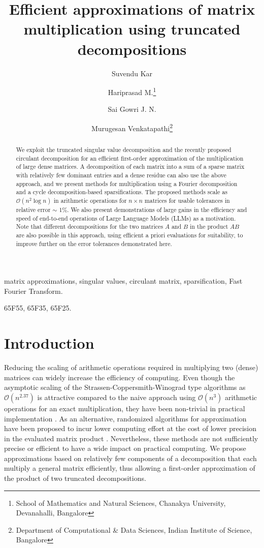 \documentclass[onefignum,onetabnum]{siamart171218}
\title{Efficient approximations of matrix multiplication using truncated decompositions}
\author{
Suvendu Kar
\and
Hariprasad M.\thanks{School of Mathematics and Natural Sciences, Chanakya University, Devanahalli, Bangalore }\email{(hariprasad.h@chanakyauniversity.edu.in)}
\and
Sai Gowri J. N.
\and
Murugesan Venkatapathi\thanks{Department of Computational \& Data Sciences, Indian Institute of Science, Bangalore }\email{(murugesh@iisc.ac.in)}
}
\begin{document}
\maketitle
	
\begin{abstract}
We exploit the truncated singular value decomposition and the recently proposed circulant decomposition for an efficient first-order approximation of the multiplication of large dense matrices. A decomposition of each matrix into a sum of a sparse matrix with relatively few dominant entries and a dense residue can also use the above approach, and we present methods for multiplication using a Fourier decomposition and a cycle decomposition-based sparsifications. The proposed methods scale as $\mathcal{O}(n^2 \log n)$ in arithmetic operations for $n \times n$ matrices for usable tolerances in relative error $\sim$ 1\%. We also present demonstrations of large gains in the efficiency and speed of end-to-end operations of Large Language Models (LLMs) as a motivation. Note that different decompositions for the two matrices $A$ and $B$ in the product $AB$ are also possible in this approach, using efficient a priori evaluations for suitability, to improve further on the error tolerances demonstrated here.
\end{abstract}
	
	\begin{keywords}
		matrix approximations, singular values, circulant matrix, sparsification, Fast Fourier Transform.
	\end{keywords}
	
	\begin{AMS}
		65F55, 65F35, 65F25.
	\end{AMS}


\section{Introduction}
Reducing the scaling of arithmetic operations required in multiplying two (dense) matrices can widely increase the efficiency of computing. Even though the asymptotic scaling of the Strassen-Coppersmith-Winograd type algorithms \cite{3,4,5,6,11, alman2024asymmetryyieldsfastermatrix} as $\mathcal{O}(n^{2.37})$ is attractive compared to the naive approach using $\mathcal{O}(n^3)$ arithmetic operations for an exact multiplication, they have been non-trivial in practical implementation \cite{7,8,9}. As an alternative, randomized algorithms for approximation have been proposed to incur lower computing effort at the cost of lower precision in the evaluated matrix product \cite{matrixmultiply2006Kannan,12}. Nevertheless, these methods are not sufficiently precise or efficient to have a wide impact on practical computing. We propose approximations based on relatively few components of a decomposition that each multiply a general matrix efficiently, thus allowing a first-order approximation of the product of two truncated decompositions.
\end{document}
